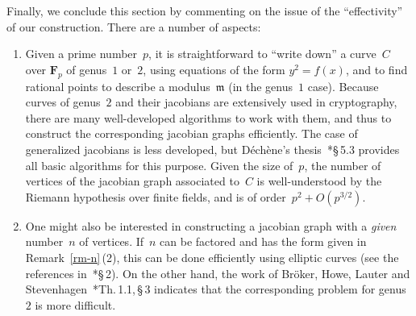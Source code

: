 \documentclass[12pt]{amsart}
\numberwithin{equation}{section}
\newcommand{\Ff}{\mathbf{F}}
\newcommand{\mfm}{\mathfrak{m}}
\theoremstyle{plain}
\theoremstyle{remark}
\theoremstyle{definition}
\begin{document}
Finally, we conclude this section by commenting on the issue of the
``effectivity'' of our construction.  There are a number of aspects:
\begin{enumerate}
\item Given a prime number~$p$, it is straightforward to ``write down''
  a curve~$C$ over $\Ff_p$ of genus~$1$ or~$2$, using equations of the
  form $y^2=f(x)$, and to find rational points to describe a
  modulus~$\mfm$ (in the genus~$1$ case). Because curves of genus~$2$
  and their jacobians are extensively used in cryptography, there are
  many well-developed algorithms to work with them, and thus to
  construct the corresponding jacobian graphs efficiently. The case of
  generalized jacobians is less developed, but Déchène's
  thesis~\cite{dechene}*{\S\,5.3} provides all basic algorithms for this
  purpose. Given the size of~$p$, the number of vertices of the jacobian graph associated to~$C$ is well-understood by the Riemann hypothesis over
  finite fields, and is of order~$p^2+O(p^{3/2})$.
  
\item One might also be interested in constructing a
  jacobian graph with a \emph{given} number~$n$ of vertices. If~$n$ can
  be factored and has the form given in Remark~\ref{rm-n}\,(2), this can
  be done efficiently using elliptic curves (see the references in~\cite{bhls}*{\S\,2}). On the other hand, the
  work of Bröker, Howe, Lauter and
  Stevenhagen~\cite{bhls}*{Th.\,1.1,\,\S\,3} indicates that the
  corresponding problem for genus~$2$ is more difficult.
\end{enumerate}
\end{document}
